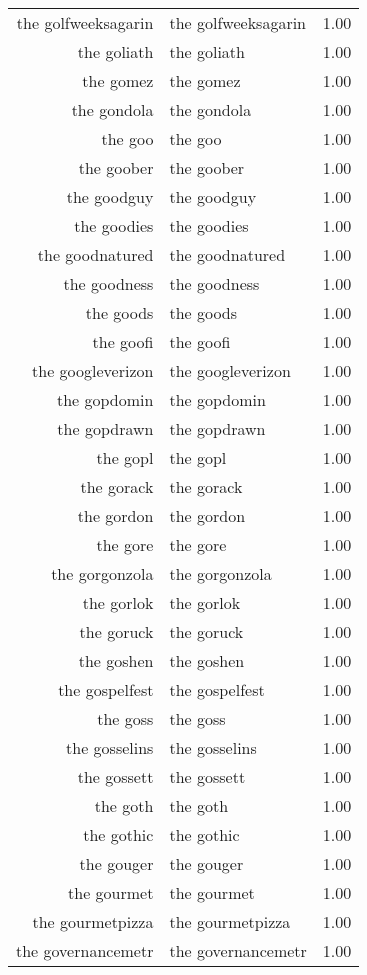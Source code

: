 \begin{table}[ht]
\begin{tabular}{rlr}
  the golfweeksagarin & the golfweeksagarin & 1.00 \\ 
  the goliath & the goliath & 1.00 \\ 
  the gomez & the gomez & 1.00 \\ 
  the gondola & the gondola & 1.00 \\ 
  the goo & the goo & 1.00 \\ 
  the goober & the goober & 1.00 \\ 
  the goodguy & the goodguy & 1.00 \\ 
  the goodies & the goodies & 1.00 \\ 
  the goodnatured & the goodnatured & 1.00 \\ 
  the goodness & the goodness & 1.00 \\ 
  the goods & the goods & 1.00 \\ 
  the goofi & the goofi & 1.00 \\ 
  the googleverizon & the googleverizon & 1.00 \\ 
  the gopdomin & the gopdomin & 1.00 \\ 
  the gopdrawn & the gopdrawn & 1.00 \\ 
  the gopl & the gopl & 1.00 \\ 
  the gorack & the gorack & 1.00 \\ 
  the gordon & the gordon & 1.00 \\ 
  the gore & the gore & 1.00 \\ 
  the gorgonzola & the gorgonzola & 1.00 \\ 
  the gorlok & the gorlok & 1.00 \\ 
  the goruck & the goruck & 1.00 \\ 
  the goshen & the goshen & 1.00 \\ 
  the gospelfest & the gospelfest & 1.00 \\ 
  the goss & the goss & 1.00 \\ 
  the gosselins & the gosselins & 1.00 \\ 
  the gossett & the gossett & 1.00 \\ 
  the goth & the goth & 1.00 \\ 
  the gothic & the gothic & 1.00 \\ 
  the gouger & the gouger & 1.00 \\ 
  the gourmet & the gourmet & 1.00 \\ 
  the gourmetpizza & the gourmetpizza & 1.00 \\ 
  the governancemetr & the governancemetr & 1.00 \\ 

\end{tabular}
\end{table}
